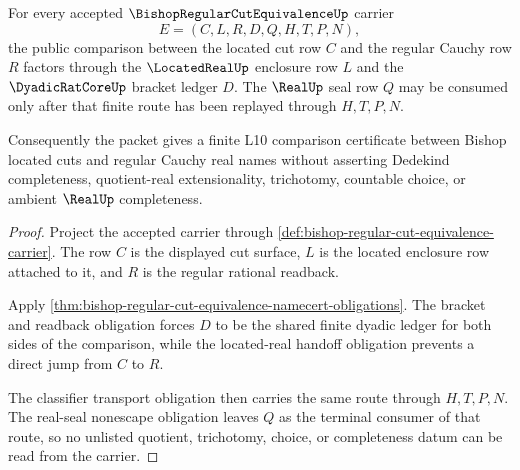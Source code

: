 \begin{theorem}
\label{thm:bishop-regular-cut-equivalence-located-real-handoff}
For every accepted $\BishopRegularCutEquivalenceUp$ carrier
$$
E=(C,L,R,D,Q,H,T,P,N),
$$
the public comparison between the located cut row $C$ and the regular Cauchy row $R$ factors through the $\LocatedRealUp$ enclosure row $L$ and the $\DyadicRatCoreUp$ bracket ledger $D$. The $\RealUp$ seal row $Q$ may be consumed only after that finite route has been replayed through $H,T,P,N$.

Consequently the packet gives a finite L10 comparison certificate between Bishop located cuts and regular Cauchy real names without asserting Dedekind completeness, quotient-real extensionality, trichotomy, countable choice, or ambient $\RealUp$ completeness.
\end{theorem}
\begin{proof}
Project the accepted carrier through \autoref{def:bishop-regular-cut-equivalence-carrier}. The row $C$ is the displayed cut surface, $L$ is the located enclosure row attached to it, and $R$ is the regular rational readback.

Apply \autoref{thm:bishop-regular-cut-equivalence-namecert-obligations}. The bracket and readback obligation forces $D$ to be the shared finite dyadic ledger for both sides of the comparison, while the located-real handoff obligation prevents a direct jump from $C$ to $R$.

The classifier transport obligation then carries the same route through $H,T,P,N$. The real-seal nonescape obligation leaves $Q$ as the terminal consumer of that route, so no unlisted quotient, trichotomy, choice, or completeness datum can be read from the carrier.
\end{proof}


\begin{closurestatus}{\BishopRegularCutEquivalenceUp}
  \theoryclosure{\seedClosure}
  \formalstatus{\unformalizedV}
\end{closurestatus}
